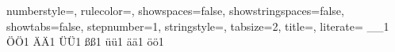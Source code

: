 {  numberstyle=\selectfont\footnotesize,				%
  rulecolor=\color{black},         																		%
  showspaces=false,                																		%
  showstringspaces=false,          																		%
  showtabs=false,                  																		%
  stepnumber=1,                    																		%
  stringstyle=\color{java_net_string},     																%
  tabsize=2,	                   																		%
  title=\lstname,                  		 																%
  literate=%
  {_}{{\_}}1
  {Ö}{{\"O}}1
  {Ä}{{\"A}}1
  {Ü}{{\"U}}1
  {ß}{{\ss}}1
  {ü}{{\"u}}1
  {ä}{{\"a}}1
  {ö}{{\"o}}1																							%
}


